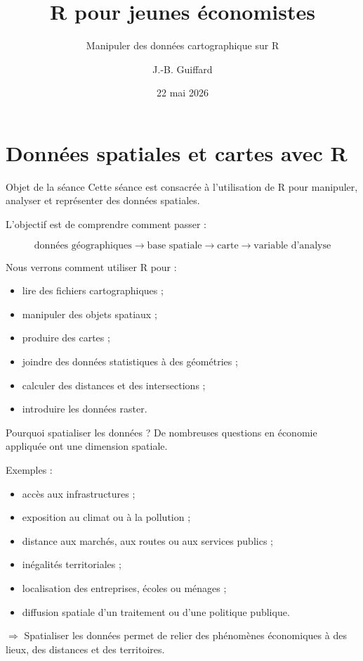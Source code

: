 \documentclass[
  10pt,
  ignorenonframetext,
]{beamer}
\title{R pour jeunes économistes}
\subtitle{Manipuler des données cartographique sur R}
\author{J.-B. Guiffard}
\date{22 mai 2026}
\providecommand{\tightlist}{%
  \setlength{\itemsep}{0pt}\setlength{\parskip}{0pt}}
\begin{document}
\frame{\titlepage}

\section{Données spatiales et cartes avec
R}\label{donnuxe9es-spatiales-et-cartes-avec-r}

\begin{frame}{Objet de la séance}
\label{objet-de-la-suxe9ance}
Cette séance est consacrée à l'utilisation de R pour manipuler, analyser
et représenter des données spatiales.

L'objectif est de comprendre comment passer :

\[
\text{données géographiques}
\rightarrow
\text{base spatiale}
\rightarrow
\text{carte}
\rightarrow
\text{variable d’analyse}
\]

Nous verrons comment utiliser R pour :

\begin{itemize}
\tightlist
\item
  lire des fichiers cartographiques ;
\item
  manipuler des objets spatiaux ;
\item
  produire des cartes ;
\item
  joindre des données statistiques à des géométries ;
\item
  calculer des distances et des intersections ;
\item
  introduire les données raster.
\end{itemize}
\end{frame}

\begin{frame}{Pourquoi spatialiser les données ?}
\label{pourquoi-spatialiser-les-donnuxe9es}
De nombreuses questions en économie appliquée ont une dimension
spatiale.

Exemples :

\begin{itemize}
  \item accès aux infrastructures ;
  \item exposition au climat ou à la pollution ;
  \item distance aux marchés, aux routes ou aux services publics ;
  \item inégalités territoriales ;
  \item localisation des entreprises, écoles ou ménages ;
  \item diffusion spatiale d’un traitement ou d’une politique publique.
\end{itemize}

\(\Rightarrow\) Spatialiser les données permet de relier des phénomènes
économiques à des lieux, des distances et des territoires.
\end{frame}
\end{document}
